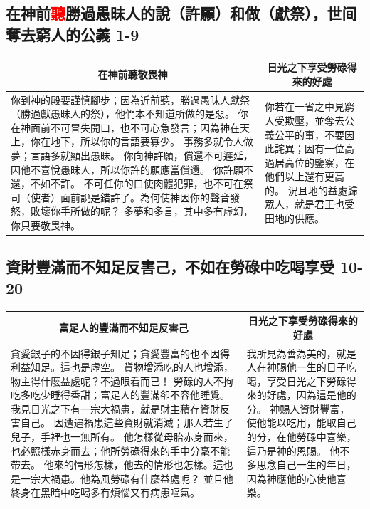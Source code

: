 \subsection{在神前\textcolor{red}{聽}勝過愚昧人的說（許願）和做（獻祭），世间奪去窮人的公義 1-9}
\begin{table}[H]
\centering
\begin{tabular}{p{12.95cm}|p{4.50cm}}\hline\hline
\multicolumn{1}{c|}{在神前聽敬畏神}&\multicolumn{1}{c}{日光之下享受勞碌得來的好處}\\\hline
你到神的殿要謹慎腳步；因為近前聽，勝過愚昧人獻祭（勝過獻愚昧人的祭），他們本不知道所做的是惡。
你在神面前不可冒失開口，也不可心急發言；因為神在天上，你在地下，所以你的言語要寡少。
事務多就令人做夢；言語多就顯出愚昧。
你向神許願，償還不可遲延，因他不喜悅愚昧人，所以你許的願應當償還。
你許願不還，不如不許。
不可任你的口使肉體犯罪，也不可在祭司（使者）面前說是錯許了。為何使神因你的聲音發怒，敗壞你手所做的呢？
多夢和多言，其中多有虛幻，你只要敬畏神。
&你若在一省之中見窮人受欺壓，並奪去公義公平的事，不要因此詫異；因有一位高過居高位的鑒察，在他們以上還有更高的。
況且地的益處歸眾人，就是君王也受田地的供應。\\\hline
\end{tabular}
\end{table}

\subsection{資財豐滿而不知足反害己，不如在勞碌中吃喝享受  10-20}
\begin{table}[H]
\centering
\begin{tabular}{p{}|p{5.5cm}}\hline\hline
\multicolumn{1}{c|}{富足人的豐滿而不知足反害己}&\multicolumn{1}{c}{日光之下享受勞碌得來的好處}\\\hline
貪愛銀子的不因得銀子知足；貪愛豐富的也不因得利益知足。這也是虛空。
貨物增添吃的人也增添，物主得什麼益處呢？不過眼看而已！
勞碌的人不拘吃多吃少睡得香甜；富足人的豐滿卻不容他睡覺。
我見日光之下有一宗大禍患，就是財主積存資財反害自己。
因遭遇禍患這些資財就消滅；那人若生了兒子，手裡也一無所有。
他怎樣從母胎赤身而來，也必照樣赤身而去；他所勞碌得來的手中分毫不能帶去。
他來的情形怎樣，他去的情形也怎樣。這也是一宗大禍患。他為風勞碌有什麼益處呢？
並且他終身在黑暗中吃喝多有煩惱又有病患嘔氣。
&我所見為善為美的，就是人在神賜他一生的日子吃喝，享受日光之下勞碌得來的好處，因為這是他的分。
神賜人資財豐富，使他能以吃用，能取自己的分，在他勞碌中喜樂，這乃是神的恩賜。
他不多思念自己一生的年日，因為神應他的心使他喜樂。\\\hline
\end{tabular}
\end{table}
 

